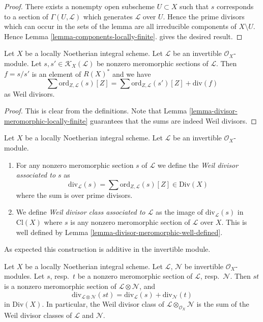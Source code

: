 \begin{proof}
There exists a nonempty open subscheme $U \subset X$ such that $s$
corresponds to a section of $\Gamma(U, \mathcal{L})$ which generates
$\mathcal{L}$ over $U$. Hence the prime divisors which can occur
in the sets of the lemma are all irreducible components of $X \setminus U$.
Hence Lemma \ref{lemma-components-locally-finite}.
gives the desired result.
\end{proof}

\begin{lemma}
\label{lemma-divisor-meromorphic-well-defined}
Let $X$ be a locally Noetherian integral scheme.
Let $\mathcal{L}$ be an invertible $\mathcal{O}_X$-module.
Let $s, s' \in \mathcal{K}_X(\mathcal{L})$ be nonzero
meromorphic sections of $\mathcal{L}$. Then $f = s/s'$
is an element of $R(X)^*$ and we have
$$
\sum \text{ord}_{Z, \mathcal{L}}(s)[Z]
=
\sum \text{ord}_{Z, \mathcal{L}}(s')[Z]
+
\text{div}(f)
$$
as Weil divisors.
\end{lemma}

\begin{proof}
This is clear from the definitions.
Note that Lemma \ref{lemma-divisor-meromorphic-locally-finite}
guarantees that the sums are indeed Weil divisors.
\end{proof}

\begin{definition}
\label{definition-divisor-invertible-sheaf}
Let $X$ be a locally Noetherian integral scheme.
Let $\mathcal{L}$ be an invertible $\mathcal{O}_X$-module.
\begin{enumerate}
\item For any nonzero meromorphic section $s$ of $\mathcal{L}$
we define the {\it Weil divisor associated to $s$} as
$$
\text{div}_\mathcal{L}(s) =
\sum \text{ord}_{Z, \mathcal{L}}(s) [Z] \in \text{Div}(X)
$$
where the sum is over prime divisors.
\item We define {\it Weil divisor class associated to $\mathcal{L}$}
as the image of $\text{div}_\mathcal{L}(s)$ in $\text{Cl}(X)$
where $s$ is any nonzero meromorphic section of $\mathcal{L}$ over
$X$. This is well defined by
Lemma \ref{lemma-divisor-meromorphic-well-defined}.
\end{enumerate}
\end{definition}

\noindent
As expected this construction is additive in the invertible module.

\begin{lemma}
\label{lemma-c1-additive}
Let $X$ be a locally Noetherian integral scheme.
Let $\mathcal{L}$, $\mathcal{N}$ be invertible $\mathcal{O}_X$-modules.
Let $s$, resp.\ $t$ be a nonzero meromorphic section
of $\mathcal{L}$, resp.\ $\mathcal{N}$. Then $st$ is a nonzero
meromorphic section of $\mathcal{L} \otimes \mathcal{N}$, and
$$
\text{div}_{\mathcal{L} \otimes \mathcal{N}}(st)
=
\text{div}_\mathcal{L}(s) + \text{div}_\mathcal{N}(t)
$$
in $\text{Div}(X)$. In particular, the Weil divisor class of
$\mathcal{L} \otimes_{\mathcal{O}_X} \mathcal{N}$ is the sum
of the Weil divisor classes of $\mathcal{L}$ and $\mathcal{N}$.
\end{lemma}


